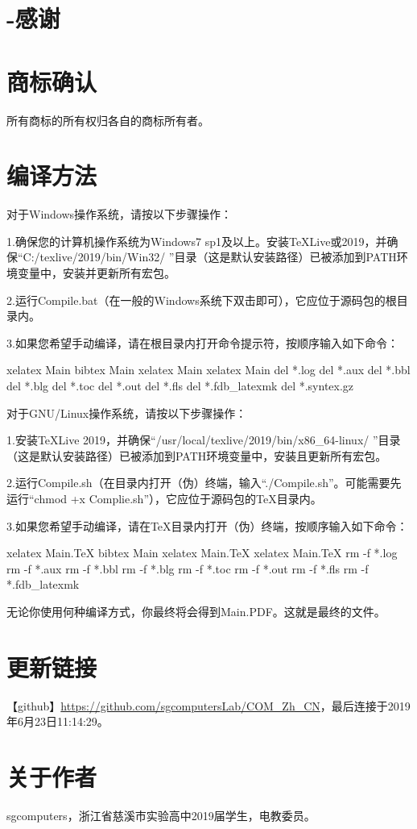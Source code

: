 \documentclass{book}
\begin{document}
\section{-感谢}
\section{商标确认}
所有商标的所有权归各自的商标所有者。
\section{编译方法}
对于Windows操作系统，请按以下步骤操作：\par
1.确保您的计算机操作系统为Windows7 sp1及以上。安装TeXLive或2019，并确保“C:/texlive/2019/bin/Win32/ ”目录（这是默认安装路径）已被添加到PATH环境变量中，安装并更新所有宏包。\par
2.运行Compile.bat（在一般的Windows系统下双击即可），它应位于源码包的根目录内。\par
3.如果您希望手动编译，请在根目录内打开命令提示符，按顺序输入如下命令：
\begin{verbatim*}
xelatex Main
bibtex Main
xelatex Main
xelatex Main
del *.log
del *.aux
del *.bbl
del *.blg
del *.toc
del *.out
del *.fls
del *.fdb_latexmk
del *.syntex.gz
\end{verbatim*}
对于GNU/Linux操作系统，请按以下步骤操作：\par
1.安装TeXLive 2019，并确保“/usr/local/texlive/2019/bin/x86\_64-linux/ ”目录（这是默认安装路径）已被添加到PATH环境变量中，安装且更新所有宏包。\par
2.运行Compile.sh（在目录内打开（伪）终端，输入“./Compile.sh”。可能需要先运行“chmod +x Complie.sh”），它应位于源码包的TeX目录内。\par
3.如果您希望手动编译，请在TeX目录内打开（伪）终端，按顺序输入如下命令：
\begin{verbatim*}
xelatex Main.TeX
bibtex Main
xelatex Main.TeX
xelatex Main.TeX
rm -f *.log
rm -f *.aux
rm -f *.bbl
rm -f *.blg
rm -f *.toc
rm -f *.out
rm -f *.fls
rm -f *.fdb_latexmk
\end{verbatim*}
无论你使用何种编译方式，你最终将会得到Main.PDF。这就是最终的文件。
\section{更新链接}
【github】\url{https://github.com/sgcomputersLab/COM_Zh_CN}，最后连接于2019年6月23日11:14:29。
\section{关于作者}
sgcomputers，浙江省慈溪市实验高中2019届学生，电教委员。

\end{document}
